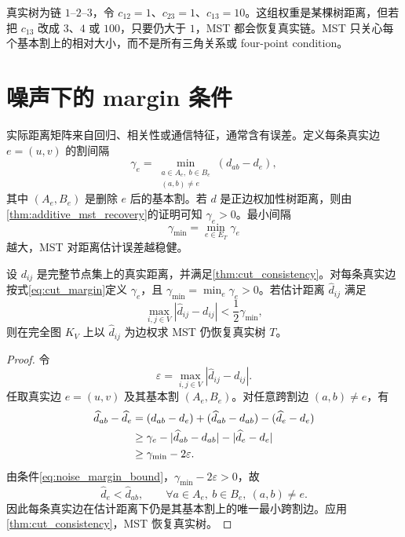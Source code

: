\begin{example}[非加性但割一致的权重]
真实树为链 $1$--$2$--$3$，令 $c_{12}=1$、$c_{23}=1$、$c_{13}=10$。这组权重是某棵树距离，但若把 $c_{13}$ 改成 $3$、$4$ 或 $100$，只要仍大于 $1$，MST 都会恢复真实链。MST 只关心每个基本割上的相对大小，而不是所有三角关系或 four-point condition。
\end{example}

\section{噪声下的 margin 条件}

实际距离矩阵来自回归、相关性或通信特征，通常含有误差。定义每条真实边 $e=(u,v)$ 的割间隔
\begin{equation}
  \gamma_e =
  \min_{\substack{a\in A_e,\ b\in B_e\\(a,b)\ne e}}
  \left(d_{ab}-d_e\right),
  \label{eq:cut_margin}
\end{equation}
其中 $(A_e,B_e)$ 是删除 $e$ 后的基本割。若 $d$ 是正边权加性树距离，则由\cref{thm:additive_mst_recovery}的证明可知 $\gamma_e>0$。最小间隔
\begin{equation}
  \gamma_{\min}=\min_{e\in E_T}\gamma_e
\end{equation}
越大，MST 对距离估计误差越稳健。

\begin{theorem}
\label{thm:noisy_margin_mst}
设 $d_{ij}$ 是完整节点集上的真实距离，并满足\cref{thm:cut_consistency}。对每条真实边按式\eqref{eq:cut_margin}定义 $\gamma_e$，且 $\gamma_{\min}=\min_e\gamma_e>0$。若估计距离 $\widehat d_{ij}$ 满足
\begin{equation}
  \max_{i,j\in V}|\widehat d_{ij}-d_{ij}|
  < \frac{1}{2}\gamma_{\min},
  \label{eq:noise_margin_bound}
\end{equation}
则在完全图 $K_V$ 上以 $\widehat d_{ij}$ 为边权求 MST 仍恢复真实树 $T$。
\end{theorem}

\begin{proof}
令
\begin{equation}
  \varepsilon=\max_{i,j\in V}|\widehat d_{ij}-d_{ij}|.
\end{equation}
任取真实边 $e=(u,v)$ 及其基本割 $(A_e,B_e)$。对任意跨割边 $(a,b)\ne e$，有
\begin{align}
  \widehat d_{ab}-\widehat d_e
  &= (d_{ab}-d_e)
     +(\widehat d_{ab}-d_{ab})
     -(\widehat d_e-d_e)  \notag\\
  &\ge \gamma_e - |\widehat d_{ab}-d_{ab}|-|\widehat d_e-d_e| \notag\\
  &\ge \gamma_{\min}-2\varepsilon .
\end{align}
由条件\eqref{eq:noise_margin_bound}，$\gamma_{\min}-2\varepsilon>0$，故
\begin{equation}
  \widehat d_e < \widehat d_{ab},\qquad
  \forall a\in A_e,\ b\in B_e,\ (a,b)\ne e .
\end{equation}
因此每条真实边在估计距离下仍是其基本割上的唯一最小跨割边。应用\cref{thm:cut_consistency}，MST 恢复真实树。
\end{proof}

